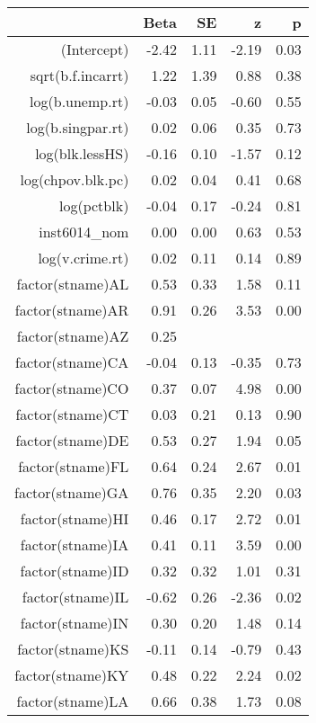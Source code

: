\begin{table}[ht]
\centering
\begin{tabular}{rrrrr}
  \hline
 & Beta & SE & z & p \\ 
  \hline
(Intercept) & -2.42 & 1.11 & -2.19 & 0.03 \\ 
  sqrt(b.f.incarrt) & 1.22 & 1.39 & 0.88 & 0.38 \\ 
  log(b.unemp.rt) & -0.03 & 0.05 & -0.60 & 0.55 \\ 
  log(b.singpar.rt) & 0.02 & 0.06 & 0.35 & 0.73 \\ 
  log(blk.lessHS) & -0.16 & 0.10 & -1.57 & 0.12 \\ 
  log(chpov.blk.pc) & 0.02 & 0.04 & 0.41 & 0.68 \\ 
  log(pctblk) & -0.04 & 0.17 & -0.24 & 0.81 \\ 
  inst6014\_nom & 0.00 & 0.00 & 0.63 & 0.53 \\ 
  log(v.crime.rt) & 0.02 & 0.11 & 0.14 & 0.89 \\ 
  factor(stname)AL & 0.53 & 0.33 & 1.58 & 0.11 \\ 
  factor(stname)AR & 0.91 & 0.26 & 3.53 & 0.00 \\ 
  factor(stname)AZ & 0.25 &  &  &  \\ 
  factor(stname)CA & -0.04 & 0.13 & -0.35 & 0.73 \\ 
  factor(stname)CO & 0.37 & 0.07 & 4.98 & 0.00 \\ 
  factor(stname)CT & 0.03 & 0.21 & 0.13 & 0.90 \\ 
  factor(stname)DE & 0.53 & 0.27 & 1.94 & 0.05 \\ 
  factor(stname)FL & 0.64 & 0.24 & 2.67 & 0.01 \\ 
  factor(stname)GA & 0.76 & 0.35 & 2.20 & 0.03 \\ 
  factor(stname)HI & 0.46 & 0.17 & 2.72 & 0.01 \\ 
  factor(stname)IA & 0.41 & 0.11 & 3.59 & 0.00 \\ 
  factor(stname)ID & 0.32 & 0.32 & 1.01 & 0.31 \\ 
  factor(stname)IL & -0.62 & 0.26 & -2.36 & 0.02 \\ 
  factor(stname)IN & 0.30 & 0.20 & 1.48 & 0.14 \\ 
  factor(stname)KS & -0.11 & 0.14 & -0.79 & 0.43 \\ 
  factor(stname)KY & 0.48 & 0.22 & 2.24 & 0.02 \\ 
  factor(stname)LA & 0.66 & 0.38 & 1.73 & 0.08 \\ 

\end{tabular}
\end{table}
